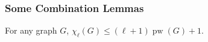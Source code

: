 \documentclass[kpfonts]{patmorin}
\DeclareMathOperator{\pw}{pw}
\newcommand{\lrn}{\chi_{\ell}}
\theoremstyle{named}
\begin{document}
%
%

\subsubsection{Some Combination Lemmas}

\begin{lem}\label{pathwidth}
    For any graph $G$, $\lrn(G)\le (\ell+1)\pw(G) + 1$.
\end{lem}
\end{document}
